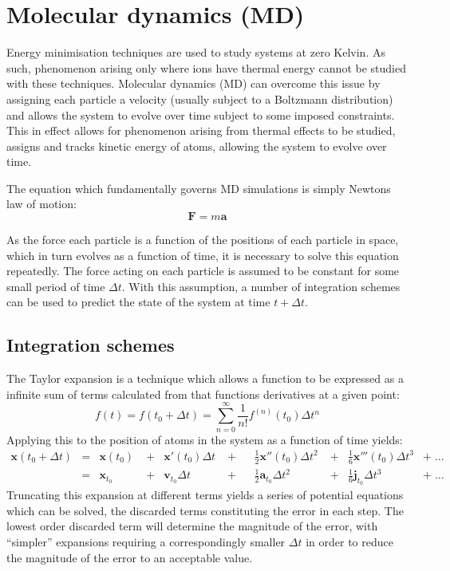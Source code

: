 \section{Molecular dynamics (MD)}
\label{sec:MD}
Energy minimisation techniques are used to study systems at zero Kelvin.
As such, phenomenon arising only where ions have thermal energy cannot be studied with these techniques.
Molecular dynamics (MD) can overcome this issue by assigning each particle a velocity (usually subject to a Boltzmann distribution) and allows the system to evolve over time subject to some imposed constraints.
This in effect allows for phenomenon arising from thermal effects to be studied,
assigns and tracks kinetic energy of atoms, allowing the system to evolve over time.

The equation which fundamentally governs MD simulations is simply Newtons law of motion:
\begin{equation}
	\mathbf{F} = m\mathbf{a}
\end{equation}

As the force each particle is a function of the positions of each particle in space, which in turn evolves as a function of time, it is necessary to solve this equation repeatedly.
The force acting on each particle is assumed to be constant for some small period of time $\Delta t$.
With this assumption, a number of integration schemes can be used to predict the state of the system at time $t +\Delta t$.
\newpage
\subsection{Integration schemes}
The Taylor expansion is a technique which allows a function to be expressed as a infinite sum of terms calculated from that functions derivatives at a given point:
\begin{equation}
f(t) = f(t_0 + \Delta t) = \sum_{n=0}^\infty \frac{1}{n!}f^{(n)}(t_0)\Delta t^n
\end{equation}
Applying this to the position of atoms in the system as a function of time yields:
\begin{align}
\mathbf{x}(t_0 + \Delta t) &= &\mathbf{x}(t_0) \; &+ &\mathbf{x}'(t_0)\Delta t \;&+& &\frac{1}{2}\mathbf{x}''(t_0)\Delta t^2 \;&+& \frac{1}{6}\mathbf{x}'''(t_0)\Delta t^3& +\;\dots\\
                           &= &\mathbf{x}_{t_0} \; &+  &\mathbf{v}_{t_0}\Delta t \;&+&   &\frac{1}{2}\mathbf{a}_{t_0}\Delta t^2     \;&+& \frac{1}{6}\mathbf{j}_{t_0}\Delta t^3& +\;\dots
\end{align}
Truncating this expansion at different terms yields a series of potential equations which can be solved, the discarded terms constituting the error in each step.
The lowest order discarded term will determine the magnitude of the error, with ``simpler'' expansions requiring a correspondingly smaller $\Delta t$ in order to reduce the magnitude of the error to an acceptable value.

